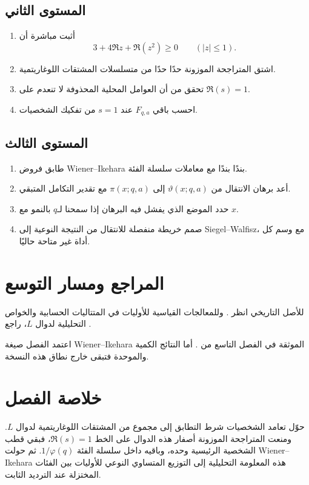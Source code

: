 \subsection{المستوى الثاني}
\begin{enumerate}
  \item أثبت مباشرة أن
  \[
  3+4\Re z+\Re(z^2)\ge0
  \qquad(|z|\le1).
  \]
  \item اشتق المتراجحة الموزونة حدًا حدًا من متسلسلات المشتقات
  اللوغاريتمية.
  \item تحقق من أن العوامل المحلية المحذوفة لا تنعدم على \(\Re(s)=1\).
  \item احسب باقي \(F_{q,a}\) عند \(s=1\) من تفكيك الشخصيات.
\end{enumerate}

\subsection{المستوى الثالث}
\begin{enumerate}
  \item طابق فروض Wiener--Ikehara بندًا بندًا مع معاملات سلسلة الفئة.
  \item أعد برهان الانتقال من \(\vartheta(x;q,a)\) إلى \(\pi(x;q,a)\)
  مع تقدير التكامل المتبقي.
  \item حدد الموضع الذي يفشل فيه البرهان إذا سمحنا لـ\(q\) بالنمو مع
  \(x\).
  \item صمم خريطة منفصلة للانتقال من النتيجة النوعية إلى Siegel--Walfisz،
  مع وسم كل أداة غير متاحة حاليًا.
\end{enumerate}

\section{المراجع ومسار التوسع}

للأصل التاريخي انظر \cite{DeLaValleePoussin1896}. وللمعالجات القياسية
للأوليات في المتتاليات الحسابية والخواص التحليلية لدوال \(L\)، راجع
\cite{Davenport2000,MontgomeryVaughan2007,Tenenbaum2015,
IwaniecKowalski2004}.

اعتمد الفصل صيغة Wiener--Ikehara الموثقة في الفصل التاسع من
\cite{Korevaar2006}. أما النتائج الكمية والموحدة فتبقى خارج نطاق هذه
النسخة.

\section{خلاصة الفصل}

حوّل تعامد الشخصيات شرط التطابق إلى مجموع من المشتقات اللوغاريتمية لدوال
\(L\). ومنعت المتراجحة الموزونة أصفار هذه الدوال على الخط \(\Re(s)=1\)،
فبقي قطب الشخصية الرئيسية وحده، وباقيه داخل سلسلة الفئة
\(1/\varphi(q)\). ثم حولت Wiener--Ikehara هذه المعلومة التحليلية إلى
التوزيع المتساوي النوعي للأوليات بين الفئات المختزلة عند الترديد الثابت.
